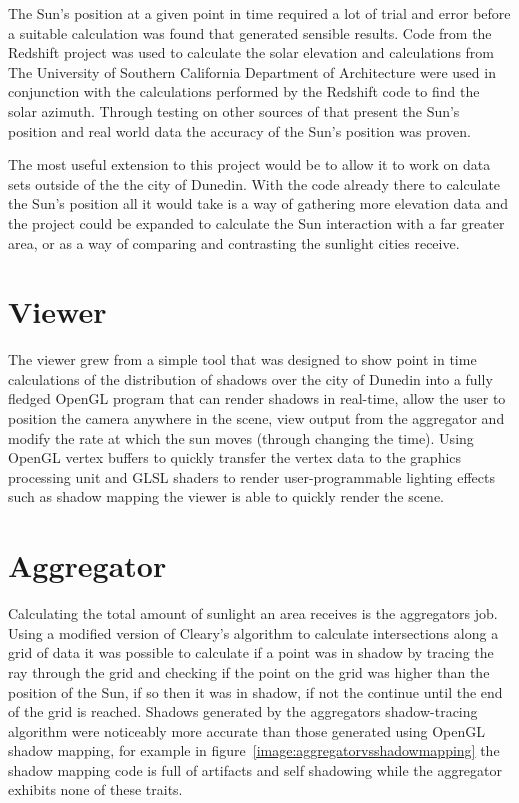 \documentclass[12pt]{report}
\begin{document}
The Sun's position at a given point in time required a lot of trial and error before a suitable calculation was found that generated sensible results. Code from the Redshift project\cite{redshift} was used to calculate the solar elevation and calculations from The University of Southern California Department of Architecture\cite{solarazi} were used in conjunction with the calculations performed by the Redshift code to find the solar azimuth. Through testing on other sources of that present the Sun's position and real world data the accuracy of the Sun's position was proven.

The most useful extension to this project would be to allow it to work on data sets outside of the the city of Dunedin. With the code already there to calculate the Sun's position all it would take is a way of gathering more elevation data and the project could be expanded to calculate the Sun interaction with a far greater area, or as a way of comparing and contrasting the sunlight cities receive. 

\section{Viewer}
The viewer grew from a simple tool that was designed to show point in time calculations of the distribution of shadows over the city of Dunedin into a fully fledged OpenGL program that can render shadows in real-time, allow the user to position the camera anywhere in the scene, view output from the aggregator and modify the rate at which the sun moves (through changing the time). Using OpenGL vertex buffers to quickly transfer the vertex data to the  graphics processing unit and GLSL shaders to render user-programmable lighting effects such as shadow mapping the viewer is able to quickly render the scene.

\section{Aggregator}
Calculating the total amount of sunlight an area receives is the aggregators job. Using a modified version of Cleary's algorithm to calculate intersections along a grid of data it was possible to calculate if a point was in shadow by tracing the ray through the grid and checking if the point on the grid was higher than the position of the Sun, if so then it was in shadow, if not the continue until the end of the grid is reached. Shadows generated by the aggregators shadow-tracing algorithm were noticeably more accurate than those generated using OpenGL shadow mapping, for example in figure~\ref{image:aggregatorvsshadowmapping} the shadow mapping code is full of artifacts and self shadowing while the aggregator exhibits none of these traits.
\end{document}
